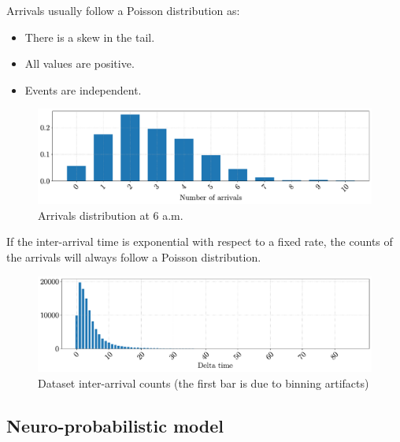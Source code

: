 \begin{remark}
    Arrivals usually follow a Poisson distribution as:
    \begin{itemize}
        \item There is a skew in the tail.
        \item All values are positive.
        \item Events are independent.
    \end{itemize}

    \begin{figure}[H]
        \centering
        \includegraphics[width=0.8\linewidth]{./img/_skinwrapper_poisson.pdf}
        \caption{Arrivals distribution at 6 a.m.}
    \end{figure}

    \begin{theorem}
        If the inter-arrival time is exponential with respect to a fixed rate, the counts of the arrivals will always follow a Poisson distribution.
    \end{theorem}

    \begin{figure}[H]
        \centering
        \includegraphics[width=0.8\linewidth]{./img/_skinwrapper_interarrival.pdf}
        \caption{Dataset inter-arrival counts (the first bar is due to binning artifacts)}
    \end{figure}
\end{remark}

\subsection{Neuro-probabilistic model} \label{sec:arrivals_neuroprob}

